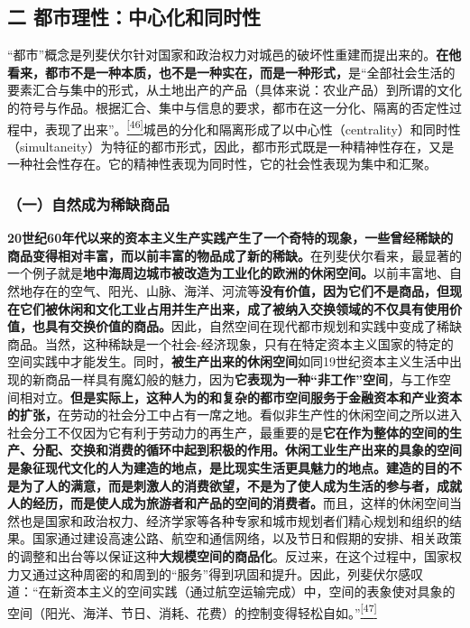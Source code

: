 \documentclass[UTF8, fontset = sourcesans, a4paper, oneside, zihao =
-4, scheme=chinese, no-math, space=true]{ctexbook}
\begin{document}
\subsection{二
都市理性：中心化和同时性}\label{part0007_split_003.htmlux5cux23c031}

``都市''概念是列斐伏尔针对国家和政治权力对城邑的破坏性重建而提出来的。\textbf{在他看来，都市不是一种本质，也不是一种实在，而是一种形式，}是``全部社会生活的要素汇合与集中的形式，从土地出产的产品（具体来说：农业产品）到所谓的文化的符号与作品。根据汇合、集中与信息的要求，都市在这一分化、隔离的否定性过程中，表现了出来''。\protect\hypertarget{part0007_split_003.htmlux5cux23w46}{}{}\protect\hyperlink{part0007_split_004.htmlux5cux23m46}{\textsuperscript{{[}46{]}}}城邑的分化和隔离形成了以中心性（centrality）和同时性（simultaneity）为特征的都市形式，因此，都市形式既是一种精神性存在，又是一种社会性存在。它的精神性表现为同时性，它的社会性表现为集中和汇聚。

\subsubsection{（一）自然成为稀缺商品}\label{part0007_split_003.htmlux5cux23d016}

\textbf{20世纪60年代以来的资本主义生产实践产生了一个奇特的现象，一些曾经稀缺的商品变得相对丰富，而以前丰富的物品成了新的稀缺。}在列斐伏尔看来，最显著的一个例子就是\textbf{地中海周边城市被改造为工业化的欧洲的休闲空间。}以前丰富地、自然地存在的空气、阳光、山脉、海洋、河流等\textbf{没有价值，因为它们不是商品，但现在它们被休闲和文化工业占用并生产出来，成了被纳入交换领域的不仅具有使用价值，也具有交换价值的商品。}因此，自然空间在现代都市规划和实践中变成了稀缺商品。当然，这种稀缺是一个社会-经济现象，只有在特定资本主义国家的特定的空间实践中才能发生。同时，\textbf{被生产出来的休闲空间}如同19世纪资本主义生活中出现的新商品一样具有魔幻般的魅力，因为\textbf{它表现为一种``非工作''空间}，与工作空间相对立。\textbf{但是实际上，这种人为的和复杂的都市空间服务于金融资本和产业资本的扩张，}在劳动的社会分工中占有一席之地。看似非生产性的休闲空间之所以进入社会分工不仅因为它有利于劳动力的再生产，最重要的是\textbf{它在作为整体的空间的生产、分配、交换和消费的循环中起到积极的作用。休闲工业生产出来的具象的空间是象征现代文化的人为建造的地点，是比现实生活更具魅力的地点。建造的目的不是为了人的满意，而是刺激人的消费欲望，不是为了使人成为生活的参与者，成就人的经历，而是使人成为旅游者和产品的空间的消费者。}而且，这样的休闲空间当然也是国家和政治权力、经济学家等各种专家和城市规划者们精心规划和组织的结果。国家通过建设高速公路、航空和通信网络，以及节日和假期的安排、相关政策的调整和出台等以保证这种\textbf{大规模空间的商品化}。反过来，在这个过程中，国家权力又通过这种周密的和周到的``服务''得到巩固和提升。因此，列斐伏尔感叹道：``在新资本主义的空间实践（通过航空运输完成）中，空间的表象使对具象的空间（阳光、海洋、节日、消耗、花费）的控制变得轻松自如。''\protect\hypertarget{part0007_split_003.htmlux5cux23w47}{}{}\protect\hyperlink{part0007_split_004.htmlux5cux23m47}{\textsuperscript{{[}47{]}}}
\end{document}
